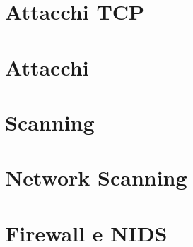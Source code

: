 \documentclass{report}
\begin{document}
\chapter{Attacchi TCP}






\chapter{Attacchi}




\chapter{Scanning}



\chapter{Network Scanning}





\chapter{Firewall e NIDS}
\end{document}
